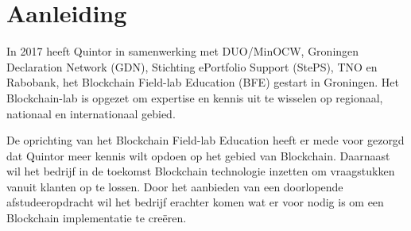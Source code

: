 \chapter{Aanleiding}

In 2017 heeft Quintor in samenwerking met DUO/MinOCW, Groningen Declaration Network (GDN), Stichting ePortfolio Support (StePS), TNO en Rabobank, het Blockchain Field-lab Education (BFE) gestart in Groningen. Het Blockchain-lab is opgezet om expertise en kennis uit te wisselen op regionaal, nationaal en internationaal gebied. 

De oprichting van het Blockchain Field-lab Education heeft er mede voor gezorgd dat Quintor meer kennis wilt opdoen op het gebied van Blockchain. Daarnaast wil het bedrijf in de toekomst Blockchain technologie inzetten om vraagstukken vanuit klanten op te lossen. Door het aanbieden van een doorlopende afstudeeropdracht wil het bedrijf erachter komen wat er voor nodig is om een Blockchain implementatie te creëren.
